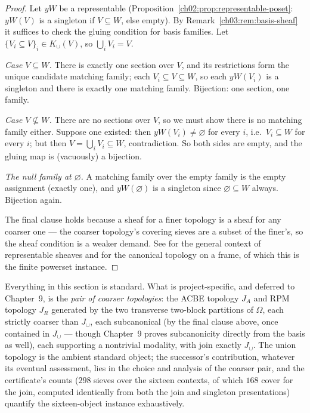 \begin{proof}
Let $yW$ be a representable
(Proposition~\ref{ch02:prop:representable-poset}: $yW(V)$ is a
singleton if $V \subseteq W$, else empty). By
Remark~\ref{ch03:rem:basis-sheaf} it suffices to check the gluing
condition for basis families. Let
$\{V_i \subseteq V\}_i \in K_{\cup}(V)$, so
$\bigcup_i V_i = V$.

\emph{Case $V \subseteq W$.} There is exactly one section over
$V$, and its restrictions form the unique candidate matching
family; each $V_i \subseteq V \subseteq W$, so each
$yW(V_i)$ is a singleton and there is exactly one matching family.
Bijection: one section, one family.

\emph{Case $V \not\subseteq W$.} There are no sections over $V$,
so we must show there is no matching family either. Suppose one
existed: then $yW(V_i) \neq \varnothing$ for every $i$, i.e.\
$V_i \subseteq W$ for every $i$; but then
$V = \bigcup_i V_i \subseteq W$, contradiction. So both sides are
empty, and the gluing map is (vacuously) a bijection.

\emph{The null family at $\varnothing$.} A matching family over
the empty family is the empty assignment (exactly one), and
$yW(\varnothing)$ is a singleton since
$\varnothing \subseteq W$ always. Bijection again.

The final clause holds because a sheaf for a finer topology is a
sheaf for any coarser one --- the coarser topology's covering
sieves are a subset of the finer's, so the sheaf condition is a
weaker demand. See \cite{stacks00WO} for the general context of
representable sheaves and \cite{johnstone} for the canonical
topology on a frame, of which this is the finite powerset
instance.
\end{proof}

\begin{remark}\label{ch03:rem:ch9-preview}
Everything in this section is standard. What is project-specific,
and deferred to Chapter~9, is the \emph{pair of coarser
topologies}: the ACBE topology $J_A$ and RPM topology $J_R$
generated by the two transverse two-block partitions of
$\Omega$, each strictly coarser than $J_{\cup}$, each
subcanonical (by the final clause above, once contained in
$J_{\cup}$ --- though Chapter~9 proves subcanonicity directly
from the basis as well), each supporting a nontrivial modality,
with join exactly $J_{\cup}$. The union topology is the ambient
standard object; the successor's contribution, whatever its
eventual assessment, lies in the choice and analysis of the
coarser pair, and the certificate's counts ($298$ sieves over
the sixteen contexts, of which $168$ cover for the join,
computed identically from both the join and singleton
presentations) quantify the sixteen-object instance
exhaustively.
\end{remark}

